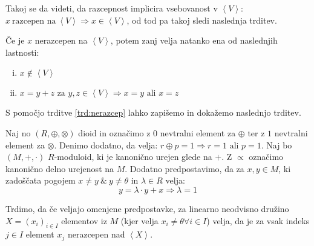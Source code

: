 \documentclass[mat1]{fmfdelo}
\newcommand{\Gen}[1]{\ensuremath{\left<{#1}\right>}}
\begin{document}
	Takoj se da videti, da razcepnost implicira vsebovanost v \Gen{V}: $x~\text{razcepen na}~ \Gen{V}\Rightarrow x\in \Gen{V}$, od tod pa takoj sledi naslednja trditev.
	
\begin{trditev}
	\label{trd:nerazcep}
	Če je $x$ nerazcepen na \Gen{V}, potem zanj velja natanko ena od naslednjih lastnosti:
	\begin{enumerate}[(i)] 
		\item $x \notin \Gen{V}$
		\item $x = y + z \text{~za~} y, z\in\Gen{V}\Rightarrow x = y \text{~ali~} x = z$
	\end{enumerate}
\end{trditev}

S pomočjo trditve \ref{trd:nerazcep} lahko zapišemo in dokažemo naslednjo trditev.

\begin{trditev}
	\label{trd:potrebzanerazcep}
	Naj no $(R, \oplus, \otimes)$ dioid in označimo z $0$ nevtralni element za $\oplus$ ter z $1$ nevtralni element za $\otimes$. Denimo dodatno, da velja: $r\oplus p = 1 \Rightarrow r = 1 \text{~ali~} p=1$. 
	Naj bo $(M, +, \cdot)$ $R$-moduloid, ki je kanonično urejen glede na $+$. Z $\varpropto$ označimo kanonično delno urejenost na $M$. Dodatno predpostavimo, da za $x, y\in M$, ki zadoščata pogojem $x \neq y ~\&~ y\neq\theta$ in $\lambda\in R$ velja: $$y = \lambda\cdot y + x \Rightarrow \lambda = 1$$
	
	Trdimo, da če veljajo omenjene predpostavke, za linearno neodvisno družino $X = (x_i)_{i\in I}$ elementov iz $M$ (kjer velja $x_i \neq \theta \forall i\in I$) velja, da je za vsak indeks $j\in I$ element $x_j$ nerazcepen nad \Gen{X}.
\end{trditev}
\end{document}
